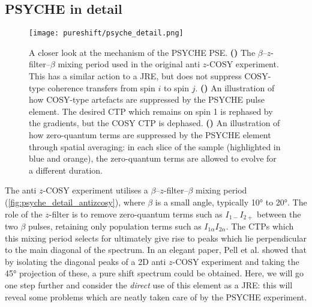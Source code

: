 \subsection{PSYCHE in detail}
\label{subsec:pureshift__psyche_analysis}

\begin{figure}[ht]
    \centering
    \texttt{[image: pureshift/psyche\_detail.png]}%
    {\label{fig:psyche_detail_antizcosy}}%
    {\label{fig:psyche_detail_cosy_suppress}}%
    {\label{fig:psyche_detail_zqc_suppress}}%
    \caption[Detailed analysis of anti $z$-COSY and PSYCHE]{
        A closer look at the mechanism of the PSYCHE PSE.
        \textbf{()} The $\beta$--$z$-filter--$\beta$ mixing period used in the original anti $z$-COSY experiment. This has a similar action to a JRE, but does not suppress COSY-type coherence transfers from spin $i$ to spin $j$.
        \textbf{()} An illustration of how COSY-type artefacts are suppressed by the PSYCHE pulse element. The desired CTP which remains on spin 1 is rephased by the gradients, but the COSY CTP is dephased.
        \textbf{()} An illustration of how zero-quantum terms are suppressed by the PSYCHE element through spatial averaging: in each slice of the sample (highlighted in blue and orange), the zero-quantum terms are allowed to evolve for a different duration.
    }
    \label{fig:psyche_detail}
\end{figure}

The anti $z$-COSY experiment utilises a $\beta$--$z$-filter--$\beta$ mixing period (\cref{fig:psyche_detail_antizcosy}), where $\beta$ is a small angle, typically \ang{10} to \ang{20}.
The role of the $z$-filter\autocite{Thrippleton2003ACIE} is to remove zero-quantum terms such as $I_{1-}I_{2+}$ between the two $\beta$ pulses, retaining only population terms such as $I_{1\alpha}I_{2\alpha}$.
The CTPs which this mixing period selects for ultimately give rise to peaks which lie perpendicular to the main diagonal of the spectrum.
In an elegant paper, Pell et al.\autocite{Pell2007MRC} showed that by isolating the diagonal peaks of a 2D anti $z$-COSY experiment and taking the \ang{45} projection of these, a pure shift spectrum could be obtained.
Here, we will go one step further and consider the \textit{direct} use of this element as a JRE: this will reveal some problems which are neatly taken care of by the PSYCHE experiment.

